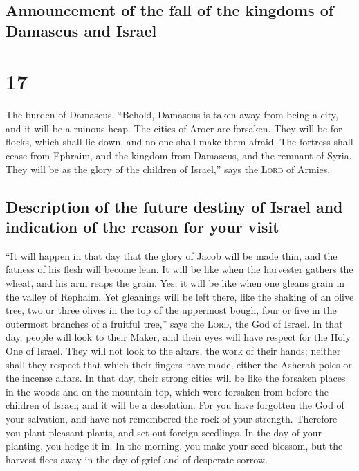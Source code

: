\hypertarget{announcement-of-the-fall-of-the-kingdoms-of-damascus-and-israel}{%
\subsection{Announcement of the fall of the kingdoms of Damascus and
Israel}\label{announcement-of-the-fall-of-the-kingdoms-of-damascus-and-israel}}

\hypertarget{section-16}{%
\section{17}\label{section-16}}

 The burden of Damascus. ``Behold, Damascus is taken away
from being a city, and it will be a ruinous heap.  The
cities of Aroer are forsaken. They will be for flocks, which shall lie
down, and no one shall make them afraid.  The fortress
shall cease from Ephraim, and the kingdom from Damascus, and the remnant
of Syria. They will be as the glory of the children of Israel,'' says
the \textsc{Lord} of Armies.

\hypertarget{description-of-the-future-destiny-of-israel-and-indication-of-the-reason-for-your-visit}{%
\subsection{Description of the future destiny of Israel and indication
of the reason for your
visit}\label{description-of-the-future-destiny-of-israel-and-indication-of-the-reason-for-your-visit}}

 ``It will happen in that day that the glory of Jacob will
be made thin, and the fatness of his flesh will become lean.
 It will be like when the harvester gathers the wheat, and
his arm reaps the grain. Yes, it will be like when one gleans grain in
the valley of Rephaim.  Yet gleanings will be left there,
like the shaking of an olive tree, two or three olives in the top of the
uppermost bough, four or five in the outermost branches of a fruitful
tree,'' says the \textsc{Lord}, the God of Israel.  In
that day, people will look to their Maker, and their eyes will have
respect for the Holy One of Israel.  They will not look to
the altars, the work of their hands; neither shall they respect that
which their fingers have made, either the Asherah poles or the incense
altars.  In that day, their strong cities will be like the
forsaken places in the woods and on the mountain top, which were
forsaken from before the children of Israel; and it will be a
desolation.  For you have forgotten the God of your
salvation, and have not remembered the rock of your strength. Therefore
you plant pleasant plants, and set out foreign seedlings.
 In the day of your planting, you hedge it in. In the
morning, you make your seed blossom, but the harvest flees away in the
day of grief and of desperate sorrow.

